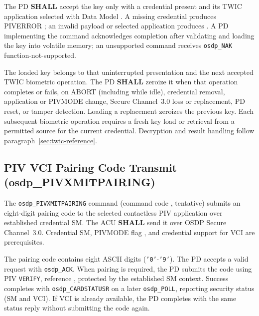 The PD \textbf{SHALL} accept the key only with a credential present and its
TWIC application selected with Data Model . A missing credential
produces PIVERROR ; an invalid payload or selected application
produces . A PD implementing the command acknowledges completion
after validating and loading the key into volatile memory; an unsupported command
receives \texttt{osdp\_NAK} function-not-supported.

The loaded key belongs to that uninterrupted presentation and the next accepted
TWIC biometric operation. The PD \textbf{SHALL} zeroize it when that operation
completes or fails, on ABORT (including while idle), credential removal,
application or PIVMODE change, Secure Channel~3.0 loss or replacement, PD reset,
or tamper detection. Loading a replacement zeroizes the previous key. Each
subsequent biometric operation requires a fresh key load or retrieval from a
permitted source for the current credential. Decryption and result handling
follow paragraph~\ref{sec:twic-reference}.

\subsection{PIV VCI Pairing Code Transmit (osdp\_PIVXMITPAIRING)}

The \texttt{osdp\_PIVXMITPAIRING} command (command code , tentative)
submits an eight-digit pairing code to the selected contactless PIV application
over established credential SM. The ACU \textbf{SHALL} send it over OSDP Secure Channel~3.0. Credential SM, PIVMODE flag , and credential support
for VCI are prerequisites.



The pairing code contains eight ASCII digits (\texttt{'0'}-\texttt{'9'}).
The PD accepts a valid request with \texttt{osdp\_ACK}. When pairing is required,
the PD submits the code using PIV \texttt{VERIFY}, reference , protected
by the established SM context. Success completes with \texttt{osdp\_CARDSTATUSR}
on a later \texttt{osdp\_POLL}, reporting security status  (SM and VCI).
If VCI is already available, the PD completes with the same status reply without
submitting the code again.

